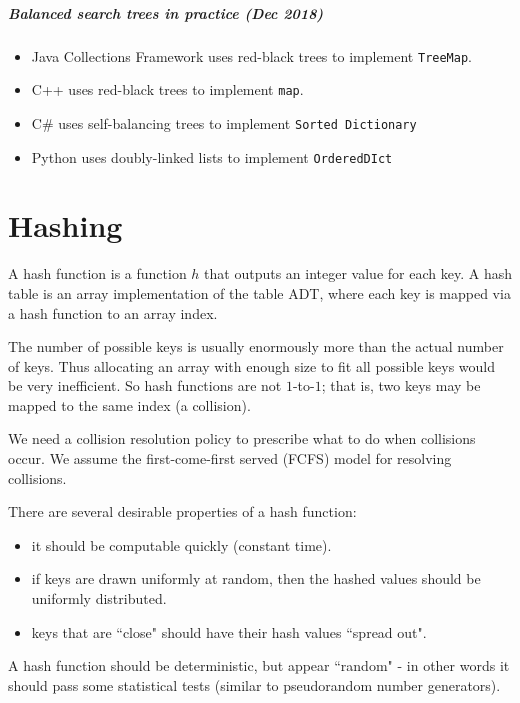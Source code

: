 \paragraph{Balanced search trees in practice (Dec 2018)}
\begin{itemize}
\item Java Collections Framework uses red-black trees to implement \texttt{TreeMap}.
\item C++  uses red-black trees to implement \texttt{map}.
\item C\# uses self-balancing trees to implement \texttt{Sorted Dictionary}
\item Python uses doubly-linked lists to implement \texttt{OrderedDIct}
\end{itemize}




\chapter{Hashing} %

\begin{Definition}
A {hash function} is a function $h$ that outputs an integer
value for each key. A {hash table} is an array implementation of
the table ADT, where each key is mapped via a hash function to an array
index. 
\item The number of possible keys is usually enormously more than
the actual number of keys. Thus allocating an array with enough size to
fit all possible keys would be very inefficient. So hash functions are
not $1$-to-$1$; that is, two keys may be mapped to the same index (a
{collision}). 
\end{Definition}
We need a collision resolution policy to prescribe what to do when 
collisions occur. 
We assume the first-come-first served (FCFS) model for resolving
collisions.

There are several desirable properties of a hash function:
\begin{itemize}
\item it should be computable quickly (constant time).
\item if keys are drawn uniformly at random, then the hashed values
should be uniformly distributed. 
\item keys that are ``close" should have their hash values ``spread out". 
\end{itemize}
A hash function should be deterministic, but appear ``random" - in other 
words it should pass some statistical tests (similar to pseudorandom number generators). 

